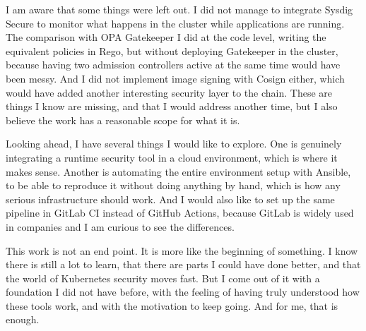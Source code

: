 I am aware that some things were left out. I did not manage to integrate Sysdig Secure to monitor what happens in the cluster while applications are running. The comparison with OPA Gatekeeper I did at the code level, writing the equivalent policies in Rego, but without deploying Gatekeeper in the cluster, because having two admission controllers active at the same time would have been messy. And I did not implement image signing with Cosign either, which would have added another interesting security layer to the chain. These are things I know are missing, and that I would address another time, but I also believe the work has a reasonable scope for what it is.

Looking ahead, I have several things I would like to explore. One is genuinely integrating a runtime security tool in a cloud environment, which is where it makes sense. Another is automating the entire environment setup with Ansible, to be able to reproduce it without doing anything by hand, which is how any serious infrastructure should work. And I would also like to set up the same pipeline in GitLab CI instead of GitHub Actions, because GitLab is widely used in companies and I am curious to see the differences.

This work is not an end point. It is more like the beginning of something. I know there is still a lot to learn, that there are parts I could have done better, and that the world of Kubernetes security moves fast. But I come out of it with a foundation I did not have before, with the feeling of having truly understood how these tools work, and with the motivation to keep going. And for me, that is enough.
